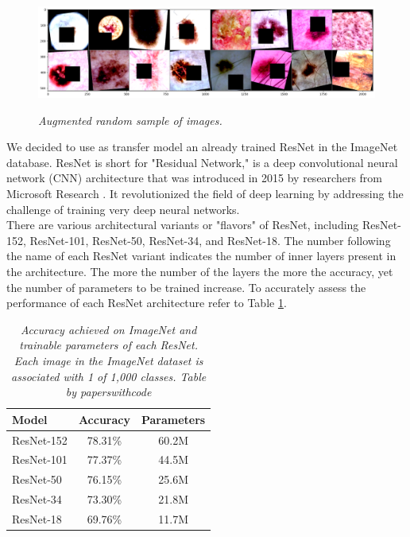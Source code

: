 \begin{figure}[H]
  \centering
  \begin{adjustbox}{width=0.9\textwidth}
  \includegraphics[width=\textwidth]{imatges/methodological_contribution/random-sample-of-isic-augmented.png}
  \end{adjustbox}
  \caption[Augmented random sample of images]{\textit{Augmented random sample of images.}}
  {\label{fig:aug-sample-of-datasets}}
\end{figure}


We decided to use as transfer model an already trained ResNet in the ImageNet
database. ResNet is short for "Residual Network," is a deep convolutional
neural network (CNN) architecture that was introduced in 2015 by researchers
from Microsoft Research \cite{ResNetPaper}. It revolutionized the field of deep
learning by addressing the challenge of training very deep neural networks. \\

There are various architectural variants or "flavors" of ResNet, including
ResNet-152,  ResNet-101,  ResNet-50,  ResNet-34, and  ResNet-18. The number
following the name of each ResNet variant indicates the number of inner layers
present in the architecture. The more the number of the layers the more the
accuracy, yet the number of parameters to be trained increase. To accurately
assess the performance of each ResNet architecture refer to Table
\ref{table:resnet}.

\begin{table}[H]
  \centering
  \begin{tabular}{lcc}
    \toprule
    \textbf{Model} & \textbf{Accuracy} & \textbf{Parameters} \\
    \midrule
    ResNet-152 & 78.31\% & 60.2M \\
    ResNet-101 & 77.37\% & 44.5M \\
    ResNet-50 & 76.15\% & 25.6M \\
    ResNet-34 & 73.30\% & 21.8M \\
    ResNet-18 & 69.76\% & 11.7M \\
    \bottomrule
  \end{tabular}
  \caption[Accuracy achieved on ImageNet and trainable parameters of each ResNet]
  {\textit{Accuracy achieved on ImageNet and trainable parameters of each ResNet.
  Each image in the ImageNet dataset is associated with 1 of 1,000 classes. Table by paperswithcode}}
  {\label{table:resnet}}
\end{table}

